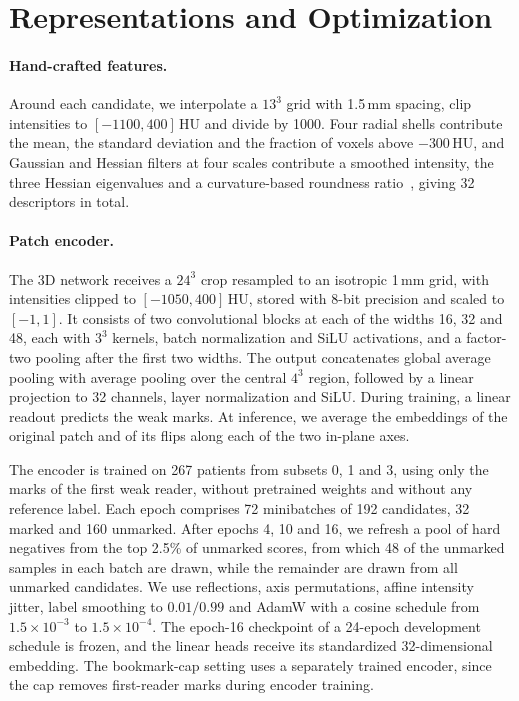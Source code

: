 \section{Representations and Optimization}
\label{sec:s-model}

\paragraph{Hand-crafted features.}
Around each candidate, we interpolate a $13^3$ grid with 1.5\,mm spacing, clip intensities to $[-1100,400]$\,HU and divide by 1000. Four radial shells contribute the mean, the standard deviation and the fraction of voxels above $-300$\,HU, and Gaussian and Hessian filters at four scales contribute a smoothed intensity, the three Hessian eigenvalues and a curvature-based roundness ratio~\cite{li2003}, giving 32 descriptors in total.

\paragraph{Patch encoder.}
The 3D network receives a $24^3$ crop resampled to an isotropic 1\,mm grid, with intensities clipped to $[-1050,400]$\,HU, stored with 8-bit precision and scaled to $[-1,1]$. It consists of two convolutional blocks at each of the widths 16, 32 and 48, each with $3^3$ kernels, batch normalization and SiLU activations, and a factor-two pooling after the first two widths. The output concatenates global average pooling with average pooling over the central $4^3$ region, followed by a linear projection to 32 channels, layer normalization and SiLU. During training, a linear readout predicts the weak marks. At inference, we average the embeddings of the original patch and of its flips along each of the two in-plane axes.

The encoder is trained on 267 patients from subsets 0, 1 and 3, using only the marks of the first weak reader, without pretrained weights and without any reference label. Each epoch comprises 72 minibatches of 192 candidates, 32 marked and 160 unmarked. After epochs 4, 10 and 16, we refresh a pool of hard negatives from the top 2.5\% of unmarked scores, from which 48 of the unmarked samples in each batch are drawn, while the remainder are drawn from all unmarked candidates. We use reflections, axis permutations, affine intensity jitter, label smoothing to $0.01/0.99$ and AdamW with a cosine schedule from $1.5{\times}10^{-3}$ to $1.5{\times}10^{-4}$. The epoch-16 checkpoint of a 24-epoch development schedule is frozen, and the linear heads receive its standardized 32-dimensional embedding. The bookmark-cap setting uses a separately trained encoder, since the cap removes first-reader marks during encoder training.


